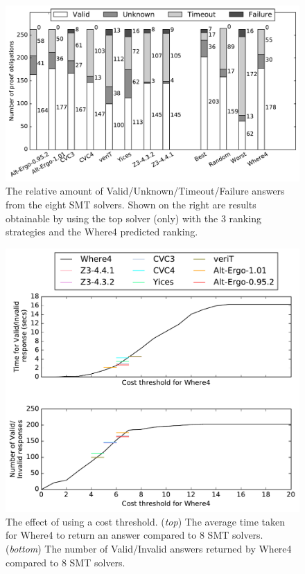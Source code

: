 \documentclass[runningheads,a4paper]{llncs}
\begin{document}
\begin{figure}
\centering
\includegraphics[width=0.9\linewidth]{barcharts2}
\caption{The relative amount of Valid/Unknown/Timeout/Failure answers from the eight SMT solvers. Shown on the right are results obtainable by using the top solver (only) with the 3 ranking strategies and the \textsf{Where4} predicted ranking.}
\label{fig:barchart2}
\end{figure}

\begin{figure}
\centering
\includegraphics[width=0.8\linewidth]{thresholds}
\caption{The effect of using a cost threshold. (\textit{top}) The average time taken for \textsf{Where4} to return an answer compared to 8 SMT solvers. (\textit{bottom}) The number of Valid/Invalid answers returned by \textsf{Where4} compared to 8 SMT solvers.}
\label{fig:thresholds}
\end{figure}
\end{document}
